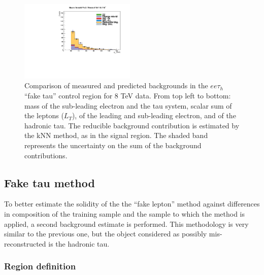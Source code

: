 \begin{figure}
\begin{center}
  \includegraphics[width=0.49\textwidth]{4_Analisys/pics/8TeV/plots/eet/f3/Full/final-f3-tPt-Full.pdf}
  \caption{Comparison of measured and predicted backgrounds in the $ee\tau_h$ ``fake tau'' control region for 8 TeV data.
  From top left to bottom: mass of the sub-leading electron and the tau system, scalar sum of the leptons \pT ($L_T$), \pT of the leading and sub-leading electron, and \pT of the hadronic tau.
  The reducible background contribution is estimated by the kNN method, as in the signal region.
  The shaded band represents the uncertainty on the sum of the background contributions.
  }
  \label{fig:LLT_eet_f3_control_8TeV}
\end{center}
\end{figure}

\subsection{Fake tau method}

To better estimate the solidity of the the ``fake lepton'' method against differences in composition of the training sample and the sample to which the method is applied, a second background estimate is performed.
This methodology is very similar to the previous one, but the object considered as possibly mis-reconstructed is the hadronic tau.

\subsubsection{Region definition}

